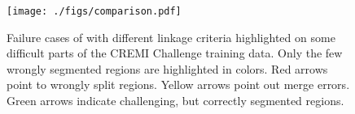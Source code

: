 
\begin{figure}[t]
\centering
\texttt{[image: ./figs/comparison.pdf]} %
\caption{Failure cases of \algname{} with different linkage criteria highlighted on some difficult parts of the CREMI Challenge \cite{cremiChallenge} training data. Only the few wrongly segmented regions are highlighted in colors. Red arrows point to wrongly split regions. Yellow arrows point out merge errors. Green arrows indicate challenging, but correctly segmented regions. 
\label{fig:cremi_comparison}}
\end{figure}

